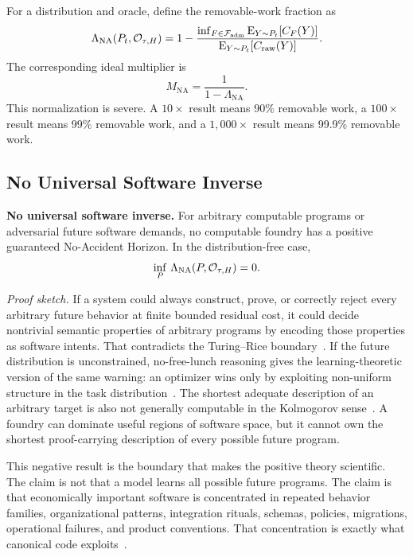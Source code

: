 For a distribution and oracle, define the removable-work fraction as
\begin{equation}
\Lambda_{\mathrm{NA}}(P_t,\mathcal{O}_{\tau,H})
=1-\frac{\inf_{F\in\mathcal{F}_{\mathrm{adm}}}\mathrm{E}_{Y\sim P_t}[C_F(Y)]}
{\mathrm{E}_{Y\sim P_t}[C_{\mathrm{raw}}(Y)]}.
\label{eq:no-accident-horizon-definition}
\end{equation}
The corresponding ideal multiplier is
\begin{equation}
M_{\mathrm{NA}}=\frac{1}{1-\Lambda_{\mathrm{NA}}}.
\label{eq:no-accident-multiplier}
\end{equation}
This normalization is severe. A $10\times$ result means 90\% removable work, a $100\times$ result means 99\% removable work, and a $1{,}000\times$ result means 99.9\% removable work.

\subsection{No Universal Software Inverse}

\textbf{No universal software inverse.} For arbitrary computable programs or adversarial future software demands, no computable foundry has a positive guaranteed No-Accident Horizon. In the distribution-free case,
\begin{equation}
\inf_{P}\,\Lambda_{\mathrm{NA}}(P,\mathcal{O}_{\tau,H})=0.
\label{eq:nah-minimax-zero}
\end{equation}

\noindent\emph{Proof sketch.} If a system could always construct, prove, or correctly reject every arbitrary future behavior at finite bounded residual cost, it could decide nontrivial semantic properties of arbitrary programs by encoding those properties as software intents. That contradicts the Turing--Rice boundary~\cite{turing1936computable,rice1953classes,riceTheoremMIT}. If the future distribution is unconstrained, no-free-lunch reasoning gives the learning-theoretic version of the same warning: an optimizer wins only by exploiting non-uniform structure in the task distribution~\cite{wolpert1997nofreelunch}. The shortest adequate description of an arbitrary target is also not generally computable in the Kolmogorov sense~\cite{liVitanyi2008}. A foundry can dominate useful regions of software space, but it cannot own the shortest proof-carrying description of every possible future program.

This negative result is the boundary that makes the positive theory scientific. The claim is not that a model learns all possible future programs. The claim is that economically important software is concentrated in repeated behavior families, organizational patterns, integration rituals, schemas, policies, migrations, operational failures, and product conventions. That concentration is exactly what canonical code exploits~\cite{hindleNaturalness,dejavu2017,jupyterClones2020,clementsProductLines,dreamcoder}.

